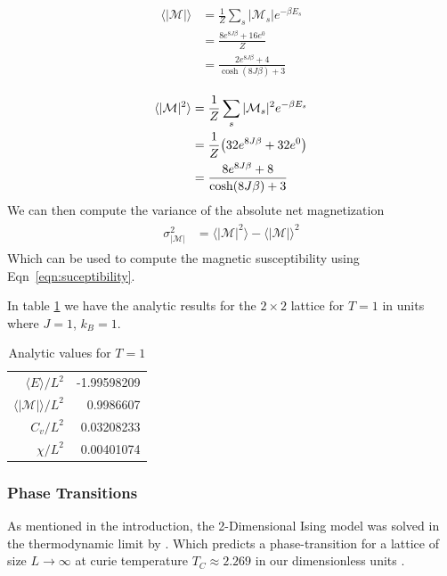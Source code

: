 \documentclass[10pt,showpacs,preprintnumbers,amsmath,amssymb,nofootinbib,aps,prl,twocolumn,groupedaddress,superscriptaddress,showkeys]{revtex4-1}
\begin{document}
    \begin{align}
      \begin{split}
        \langle |\mathcal M | \rangle &= \frac{1}{Z} \sum_s |\mathcal M_s | e^{-\beta E_s} 
          \\
        &= \frac{8e^{8J\beta} + 16e^0}{Z} 
          \\
        &= \frac{2e^{8J\beta} + 4}{\cosh(8J\beta) + 3}
      \end{split}
    \end{align}

    \begin{align}
      \begin{split}
        \langle |\mathcal M |^2 \rangle &= \frac{1}{Z}\sum_s|\mathcal M_s|^2e^{-\beta E_s} 
          \\
        &= \frac{1}{Z}\qty(32e^{8J\beta} + 32e^{0}) 
          \\
        &= \frac{8e^{8J\beta} + 8}{\cosh(8J\beta) + 3}
      \end{split}
    \end{align}
    We can then compute the variance of the absolute net magnetization
    \begin{align}
      \begin{split}
        \sigma_{|\mathcal M|}^2 &= \langle |\mathcal M|^2\rangle - \langle |\mathcal M|\rangle^2
      \end{split}
    \end{align}
    Which can be used to compute the magnetic susceptibility using Eqn~\ref{eqn:suceptibility}.

    In table \ref{tab:2x2expec} we have the analytic results for the $2\times2$ lattice for $T=1$ in units where $J=1$, $k_B=1$.

    \begin{table}[H]
      \centering
      \caption{\label{tab:2x2expec} Analytic values for $T=1$}
      \begin{tabular}{r|r}
        $\langle E \rangle / L^2$ & -1.99598209\\
        $\langle |\mathcal M| \rangle / L^2$ & 0.9986607 \\
        $ C_v / L^2$ &  0.03208233 \\
        $\chi / L^2$ & 0.00401074 \\

      \end{tabular}
    \end{table}

    \subsubsection{Phase Transitions}
      As mentioned in the introduction, the 2-Dimensional Ising model was solved in the thermodynamic limit by \textcite{PhysRev.65.117}. Which predicts a phase-transition for a lattice of size $L\rightarrow \infty$ at curie temperature $T_C \approx 2.269$ in our dimensionless units \cite{project4}. 
\end{document}
